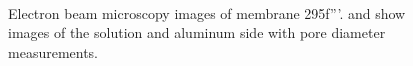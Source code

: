 \documentclass[../thesis.tex]{subfiles}
\begin{document}
        \begin{figure}[p]
          \centering
          \\
          \caption{Electron beam microscopy images of membrane 295f'''. \protect{} and \protect{} show images of the solution and aluminum side with pore diameter measurements.}
          \label{fig:295f-200ALD-sem}
        \end{figure}
\end{document}
